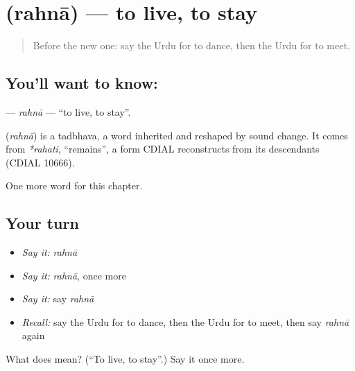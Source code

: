 \section[\texorpdfstring{\ur{رہنا} (rahnā)}{رہنا (rahnā)}]{ (rahnā) — to live, to stay}

\label{lesson:UR-C50-rahna}



\begin{quote}
Before the new one: say the Urdu for to dance, then the Urdu for to meet.
\end{quote}

\subsection*{You'll want to know: }
\textbf{} — \emph{rahnā} — \textquotedblleft{}to live, to stay\textquotedblright{}.

\begin{cousinweb}
\textbf{} (\emph{rahnā}) is a tadbhava, a word inherited and reshaped by sound change. It comes from \emph{*rahati}, \textquotedblleft{}remains\textquotedblright{}, a form CDIAL reconstructs from its descendants (CDIAL 10666).
\end{cousinweb}

\begin{grammarlens}[title={What you've built}]
One more word for this chapter.
\end{grammarlens}

\subsection*{Your turn}
\begin{itemize}
\raggedright
  \item \emph{Say it:} \emph{rahnā}
  \item \emph{Say it:} \emph{rahnā}, once more
  \item \emph{Say it:} say \emph{rahnā}
  \item \emph{Recall:} say the Urdu for to dance, then the Urdu for to meet, then say \emph{rahnā} again
\end{itemize}

\begin{tcolorbox}[breakable,colback=teal!4,colframe=teal!35!black,title={Before you move on}]
What does  mean? (\textquotedblleft{}To live, to stay\textquotedblright{}.) Say it once more.
\end{tcolorbox}
